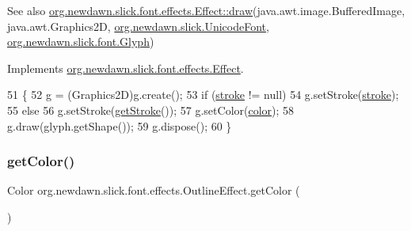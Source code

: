 \begin{DoxySeeAlso}{See also}
\mbox{\hyperlink{interfaceorg_1_1newdawn_1_1slick_1_1font_1_1effects_1_1_effect_a234db1cd6151bdbe9fda2099ee71eafb}{org.\+newdawn.\+slick.\+font.\+effects.\+Effect\+::draw}}(java.\+awt.\+image.\+Buffered\+Image, java.\+awt.\+Graphics2D, \mbox{\hyperlink{classorg_1_1newdawn_1_1slick_1_1_unicode_font}{org.\+newdawn.\+slick.\+Unicode\+Font}}, \mbox{\hyperlink{classorg_1_1newdawn_1_1slick_1_1font_1_1_glyph}{org.\+newdawn.\+slick.\+font.\+Glyph}}) 
\end{DoxySeeAlso}


Implements \mbox{\hyperlink{interfaceorg_1_1newdawn_1_1slick_1_1font_1_1effects_1_1_effect_a234db1cd6151bdbe9fda2099ee71eafb}{org.\+newdawn.\+slick.\+font.\+effects.\+Effect}}.


\begin{DoxyCode}
51                                                                                               \{
52         g = (Graphics2D)g.create();
53         \textcolor{keywordflow}{if} (\mbox{\hyperlink{classorg_1_1newdawn_1_1slick_1_1font_1_1effects_1_1_outline_effect_a4a9b2320afee8e246983b063c5cdafe9}{stroke}} != null)
54             g.setStroke(\mbox{\hyperlink{classorg_1_1newdawn_1_1slick_1_1font_1_1effects_1_1_outline_effect_a4a9b2320afee8e246983b063c5cdafe9}{stroke}});
55         \textcolor{keywordflow}{else}
56             g.setStroke(\mbox{\hyperlink{classorg_1_1newdawn_1_1slick_1_1font_1_1effects_1_1_outline_effect_a07b01aefe35fa2cefeb844fdb68745e9}{getStroke}}());
57         g.setColor(\mbox{\hyperlink{classorg_1_1newdawn_1_1slick_1_1font_1_1effects_1_1_outline_effect_a00160c4c005cb659d45c135a2798005f}{color}});
58         g.draw(glyph.getShape());
59         g.dispose();
60     \}
\end{DoxyCode}
\mbox{\label{classorg_1_1newdawn_1_1slick_1_1font_1_1effects_1_1_outline_effect_ac32467f7a5e788e89065d2bdc90b22eb}} 
\subsubsection{\texorpdfstring{get\+Color()}{getColor()}}
{\footnotesize\ttfamily Color org.\+newdawn.\+slick.\+font.\+effects.\+Outline\+Effect.\+get\+Color (\begin{DoxyParamCaption}{ }\end{DoxyParamCaption})\hspace{0.3cm}{\ttfamily [inline]}}

